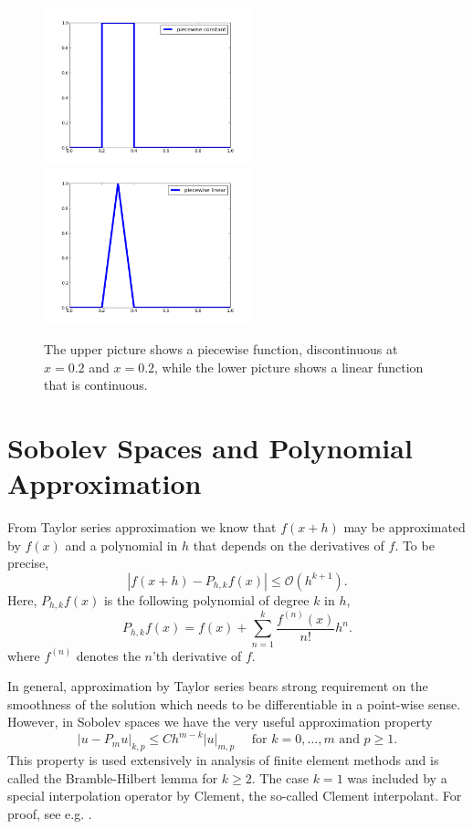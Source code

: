 \begin{figure}
\begin{center}
\includegraphics[width=6cm]{chapters/SobolevCrash/pc.png}
\includegraphics[width=6cm]{chapters/SobolevCrash/pl.png}
\caption{The upper picture shows a piecewise function, discontinuous at $x=0.2$ and $x=0.2$, while
the lower picture shows a linear function that is continuous. }  
\label{fig:piecewise}
\end{center}
\end{figure}

\section{Sobolev Spaces and Polynomial Approximation}
From Taylor series approximation we know that  $f(x+h)$ may be approximated
by $f(x)$ and a polynomial in $h$ that depends on the derivatives of $f$. 
To be precise, 
\[
|f(x+h) - P_{h,k} f (x) |  \le  \mathcal{O}(h^{k+1}) .    
\]
Here, $P_{h,k} f(x)$ is the following polynomial of degree $k$ in $h$, 
\[
P_{h,k} f(x) = f(x) + \sum_{n=1}^k \frac{f^{(n)}(x)}{n!} h^n . 
\]
where $f^{(n)}$ denotes the $n$'th derivative of $f$. 

In general, approximation by Taylor series bears strong requirement on the smoothness 
of the solution which needs to be differentiable in a point-wise sense.   
However, in Sobolev spaces we have the very useful approximation property  
\[
|u - P_m u|_{k,p} \le C h^{m-k} |u|_{m,p} \quad \mbox{ for } k=0,\ldots,m \mbox{ and }  p\ge 1. 
\]
This property is used extensively in analysis of finite element methods and
is called the Bramble-Hilbert lemma for $k\ge 2$. The case $k=1$ was included by a special interpolation operator by 
Clement, the so-called Clement interpolant. 
For proof, see e.g. \cite{braess2007finite, brenner2008mathematical}.  




